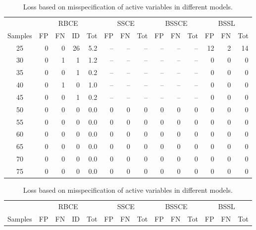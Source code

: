 \documentclass[preprint,12pt]{elsarticle}
\begin{document}
\begin{table}[ht]
\caption{Loss based on misspecification of active variables in different
models.}\label{tab:misspec}
\centering
{}
\begin{tabular}{|c||rrr|r||rr|r||rr|r||rr|r|}
  \hline
  &\multicolumn{4}{c||}{RBCE}&\multicolumn{3}{c||}{SSCE}
  &\multicolumn{3}{c||}{BSSCE}&\multicolumn{3}{c|}{BSSL}\\
  \cline{2-14}
 Samples & FP & FN & ID & Tot & FP & FN & Tot & FP & FN & Tot & FP & FN & Tot \\ 
  \hline
25 &   0 &   0 &  26 & 5.2 & -- & -- & -- & -- & -- & -- &  12 &   2 & 14\\ 
  30 &   0 &   1 &   1 & 1.2 & -- & -- & -- & -- & -- & -- &   0 &   0 & 0\\ 
  35 &   0 &   0 &   1 & 0.2 & -- & -- & -- & -- & -- & -- &   0 &   0 & 0\\ 
  40 &   0 &   1 &   0 & 1.0 &-- & -- & -- & -- & -- & -- &   0 &   0 & 0\\ 
  45 &   0 &   0 &   1 & 0.2 & -- & -- & -- & -- & -- & -- &   0 &   0 & 0\\ 
  50 &   0 &   0 &   0 & 0.0 &  0 &   0  & 0 &   0 &   0  & 0 &   0 &   0  & 0\\ 
  55 &   0 &   0 &   0 & 0.0 &   0 &   0 &   0  & 0 &   0  & 0 &   0 &   0  & 0\\ 
  60 &   0 &   0 &   0 & 0.0 &   0 &   0 &   0 &   0  & 0  & 0 &   0 &   0  & 0\\ 
  65 &   0 &   0 &   0 & 0.0 &   0 &   0 &   0 &   0 &   0  & 0  & 0 &   0  & 0\\ 
  70 &   0 &   0 &   0 & 0.0 &   0 &   0 &   0 &   0 &   0  & 0  & 0 &   0  & 0\\ 
  75 &   0 &   0 &   0 & 0.0 &   0 &   0 &   0 &   0 &   0  & 0  & 0 &   0  & 0\\ 
   \hline
\end{tabular}
\begin{tabular}{|c||rrr|r||rr|r||rr|r||rr|r|}
  \hline
  &\multicolumn{4}{c||}{RBCE}&\multicolumn{3}{c||}{SSCE}
  &\multicolumn{3}{c||}{BSSCE}&\multicolumn{3}{c|}{BSSL}\\
  \cline{2-14}
 Samples & FP & FN & ID & Tot & FP & FN & Tot & FP & FN & Tot & FP & FN & Tot \\ 
  \hline

\end{tabular}
\end{table}
\end{document}
